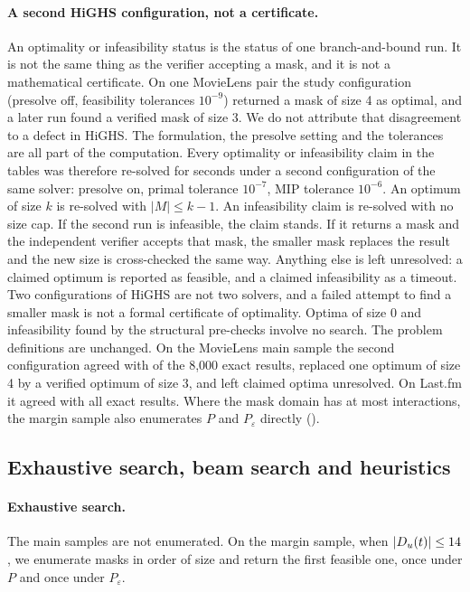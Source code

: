 \documentclass[11pt]{article}
\newcommand{\Peps}{P_\varepsilon}
\begin{document}
\paragraph{A second HiGHS configuration, not a certificate.} An optimality or infeasibility status is the status of
one branch-and-bound run. It is not the same thing as the verifier accepting a mask, and it is not a mathematical
certificate. On one MovieLens pair the study configuration (presolve off, feasibility tolerances $10^{-9}$) returned
a mask of size 4 as optimal, and a later run found a verified mask of size 3. We do not attribute that disagreement
to a defect in HiGHS. The formulation, the presolve setting and the tolerances are all part of the computation.
Every optimality or infeasibility claim in the tables was therefore re-solved for \CertLimit{} seconds under a
second configuration of the same solver: presolve on, primal tolerance $10^{-7}$, MIP tolerance $10^{-6}$. An
optimum of size $k$ is re-solved with $|M|\le k-1$. An infeasibility claim is re-solved with no size cap. If the
second run is infeasible, the claim stands. If it returns a mask and the independent verifier accepts that mask, the
smaller mask replaces the result and the new size is cross-checked the same way. Anything else is left unresolved: a
claimed optimum is reported as feasible, and a claimed infeasibility as a timeout. Two configurations of HiGHS are
not two solvers, and a failed attempt to find a smaller mask is not a formal certificate of optimality. Optima of
size 0 and infeasibility found by the structural pre-checks involve no search. The problem definitions are unchanged.
On the MovieLens main sample the second configuration agreed with \MLCertConfirmed{} of the 8{,}000 exact results,
replaced one optimum of size 4 by a verified optimum of size 3, and left \MLCertUndecided{} claimed optima
unresolved. On Last.fm it agreed with all \LFCertConfirmed{} exact results. Where the mask domain has at most
\EnumMax{} interactions, the margin sample also enumerates $P$ and $\Peps$ directly ().

\subsection{Exhaustive search, beam search and heuristics}

\paragraph{Exhaustive search.} The main samples are not enumerated. On the margin sample, when $|D_u(t)|\le14$,
we enumerate masks in order of size and return the first feasible one, once under $P$ and once under $\Peps$.
\end{document}
